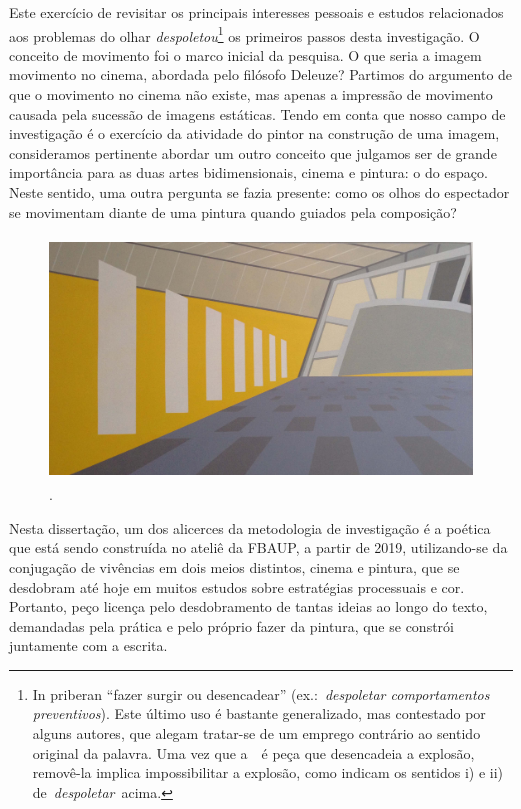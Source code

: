 Este exercício de revisitar os principais interesses pessoais e estudos
relacionados aos problemas do olhar \emph{despoletou}\footnote{In
	priberan \enquote{fazer surgir ou desencadear} (ex.:~\emph{despoletar
		comportamentos preventivos}). Este último uso é bastante generalizado,
	mas contestado por alguns autores, que alegam tratar-se de um emprego
	contrário ao sentido original da palavra. Uma vez que
	a~~é peça que
	desencadeia a explosão, removê-la implica impossibilitar a explosão,
	como indicam os sentidos i) e ii) de~\emph{despoletar}~acima.} os
primeiros passos desta investigação. O conceito de movimento foi o
marco inicial da pesquisa. O que seria a imagem movimento no cinema,
abordada pelo filósofo Deleuze? Partimos do argumento de que o
movimento no cinema não existe, mas apenas a impressão de movimento
causada pela sucessão de imagens estáticas. Tendo em conta que nosso
campo de investigação é o exercício da atividade do pintor na
construção de uma imagem, consideramos pertinente abordar um outro
conceito que julgamos ser de grande importância para as duas artes
bidimensionais, cinema e pintura: o do espaço. Neste sentido, uma outra
pergunta se fazia presente: como os olhos do espectador se movimentam
diante de uma pintura quando guiados pela composição?

\begin{figure}
  \caption{.}

	\includegraphics[width=4.73436in,height=2.54545in]{figuras/odette-gare-no-cinema.pdf.compressed.pdf}
\end{figure}

Nesta dissertação, um dos alicerces da metodologia de investigação é a
poética que está sendo construída no ateliê da FBAUP, a partir de 2019,
utilizando-se da conjugação de vivências em dois meios distintos,
cinema e pintura, que se desdobram até hoje em muitos estudos sobre
estratégias processuais e cor. Portanto, peço licença pelo
desdobramento de tantas ideias ao longo do texto, demandadas pela
prática e pelo próprio fazer da pintura, que se constrói juntamente com
a escrita.

